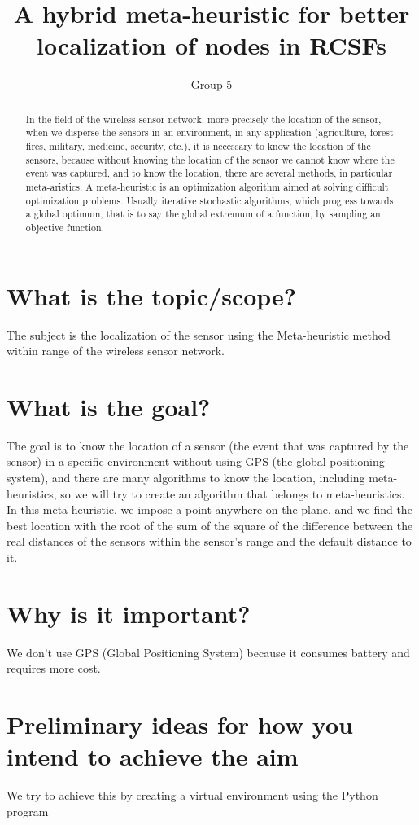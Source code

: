 \documentclass{article}
\title{A hybrid meta-heuristic for better localization of nodes in RCSFs}
\author{Group 5}
\begin{document}
\maketitle


\begin{abstract}
    In the field of the wireless sensor network, more precisely the location of the sensor, when we disperse the sensors in an environment, in any application (agriculture, forest fires, military, medicine, security, etc.), it is necessary to know the location of the sensors, because without knowing the location of the sensor we cannot know where the event was captured, and to know the location, there are several methods, in particular meta-aristics.
     A meta-heuristic is an optimization algorithm aimed at solving difficult optimization problems. Usually iterative stochastic algorithms, which progress towards a global optimum, that is to say the global extremum of a function, by sampling an objective function.
\end{abstract}

\section{ What is the topic/scope?}
The subject is the localization of the sensor using the Meta-heuristic method within range of the wireless sensor network.



\section{ What is the goal?}
The goal is to know the location of a sensor (the event that was captured by the sensor) in a specific environment without using GPS (the global positioning system), and there are many algorithms to know the location, including meta-heuristics, so we will try to create an algorithm that belongs to meta-heuristics.
In this meta-heuristic, we impose a point anywhere on the plane, and we find the best location with the root of the sum of the square of the difference between the real distances of the sensors within the sensor's range and the default distance to it.
\section{ Why is it important?}
We don't use GPS (Global Positioning System) because it consumes battery and requires more cost.
\section{ Preliminary ideas for how you intend to achieve the aim}
We try to achieve this by creating a virtual environment using the Python program
\end{document}
